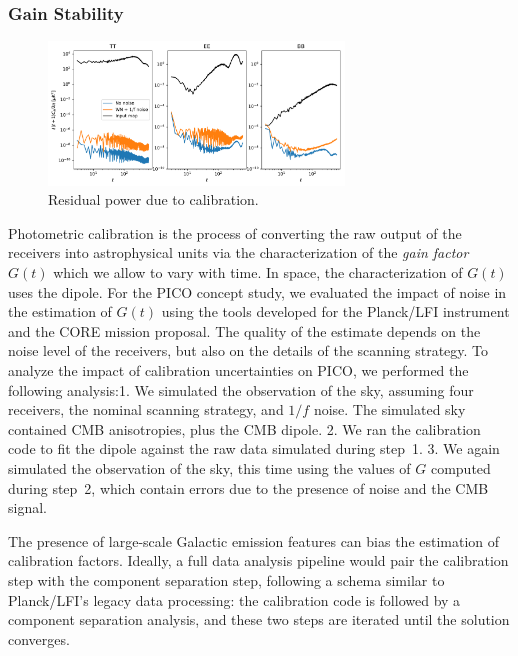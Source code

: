 \documentclass[PICOReport.tex]{subfiles}
\begin{document}
\subsubsection{Gain Stability}
\label{sec:gain}


\begin{figure}[htb]
\includegraphics[width=0.7\textwidth]{images/calibration_spectra.pdf}
\caption{\label{fig:calibration_spectra} Residual power due to calibration.}
\end{figure}

Photometric calibration is the process of converting the raw output of the receivers into astrophysical units via the characterization of the \emph{gain factor} $G(t)$ which we allow to vary with time.  In space, the characterization of $G(t)$ uses the dipole.   For the PICO concept study, we evaluated the impact of noise in the estimation of $G(t)$ using the tools developed for the Planck/LFI instrument and the CORE mission proposal. The quality of the estimate depends on the noise level of the receivers, but also on the details of the scanning strategy. 
To analyze the impact of calibration uncertainties on PICO, we performed  the following analysis:1. We simulated the observation of the sky, assuming four receivers, the nominal scanning strategy, and $1/f$ noise. The simulated sky contained CMB anisotropies, plus the CMB dipole. 2. We ran the calibration code to fit the dipole against the raw data simulated during step~1. 3. We again simulated the observation of the sky, this time using the values of $G$ computed during step~2, which contain errors due to the presence of noise and the CMB signal.

The presence of large-scale Galactic emission features can bias the estimation of calibration factors. Ideally, a full data analysis pipeline would pair the calibration step with the component separation step, following a schema similar to Planck/LFI's legacy data processing\cite{Planck2018_II}: the calibration code is followed by a component separation analysis, and these two steps are iterated until the solution converges.
\end{document}
